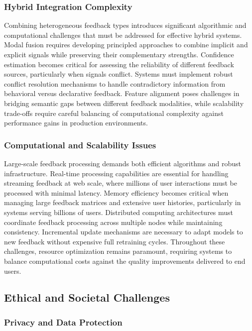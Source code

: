 \subsubsection{Hybrid Integration Complexity}

Combining heterogeneous feedback types introduces significant algorithmic and computational challenges that must be addressed for effective hybrid systems. Modal fusion requires developing principled approaches to combine implicit and explicit signals while preserving their complementary strengths. Confidence estimation becomes critical for assessing the reliability of different feedback sources, particularly when signals conflict. Systems must implement robust conflict resolution mechanisms to handle contradictory information from behavioral versus declarative feedback. Feature alignment poses challenges in bridging semantic gaps between different feedback modalities, while scalability trade-offs require careful balancing of computational complexity against performance gains in production environments.

\subsubsection{Computational and Scalability Issues}

Large-scale feedback processing demands both efficient algorithms and robust infrastructure. Real-time processing capabilities are essential for handling streaming feedback at web scale, where millions of user interactions must be processed with minimal latency. Memory efficiency becomes critical when managing large feedback matrices and extensive user histories, particularly in systems serving billions of users. Distributed computing architectures must coordinate feedback processing across multiple nodes while maintaining consistency. Incremental update mechanisms are necessary to adapt models to new feedback without expensive full retraining cycles. Throughout these challenges, resource optimization remains paramount, requiring systems to balance computational costs against the quality improvements delivered to end users.

\subsection{Ethical and Societal Challenges}

\subsubsection{Privacy and Data Protection}

